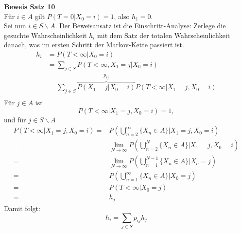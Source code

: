 \documentclass[a4paper,12pt]{article}
\begin{document}
\textbf{Beweis Satz 10}\\
Für $i \in A$ gilt $P(T=0|X_0 = i) = 1$, also $h_1 = 0$.\\
Sei nun $i \in S \backslash A$. Der Beweisansatz ist die Einschritt-Analyse:
Zerlege die gesuchte Wahrscheinlichkeit $h_i$ mit dem Satz der totalen Wahrscheinlichkeit danach, was im ersten Schritt der Markov-Kette passiert ist.
\begin{align*}
	h_i & = P(T<\infty|X_0 = i)                                                                    \\
	    & = \sum_{j \in S} P(T < \infty, X_1 = j | X_0 = i)                                        \\
	    & = \sum_{j \in S} \overbrace{P(X_1 = j|X_0 = i)}^{p_{ij}}P(T < \infty | X_1 = j, X_0 = i) \\
\end{align*}
Für $j \in A$ ist
$$
	P(T<\infty|X_1 = j, X_0 = i) = 1,
$$
und für $j \in S \backslash A$
\begin{align*}
	P(T< \infty | X_1 = j, X_0 = i) = & P\left(\bigcup_{n=2}^\infty \{X_n \in A\}| X_1 = j, X_0 = i\right)                \\
	=                                 & \lim_{N \to \infty} P\left(\bigcup_{n=2}^N \{X_n \in A\}| X_1 = j, X_0 = i\right) \\
	=                                 & \lim_{N \to \infty} P \left(\bigcup_{n=1}^{N-1} \{X_n \in A\}| X_o = j\right)     \\
	=                                 & P\left(\bigcup_{n=1}^\infty \{X_n \in A\}| X_0 = j\right)                         \\
	=                                 & P(T < \infty | X_0 = j)                                                           \\
	=                                 & h_j
\end{align*}
Damit folgt: $$h_i = \sum_{j \in S}p_{ij}h_j$$
\end{document}

